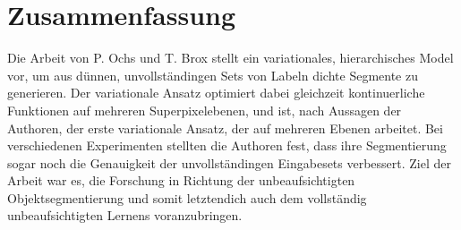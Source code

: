 \section{Zusammenfassung}

Die Arbeit von P. Ochs und T. Brox stellt ein variationales, hierarchisches Model vor, um aus dünnen, unvollständingen Sets von Labeln dichte Segmente
zu generieren. Der variationale Ansatz optimiert dabei gleichzeit kontinuerliche Funktionen auf mehreren Superpixelebenen, und ist, nach Aussagen
der Authoren, der erste variationale Ansatz, der auf mehreren Ebenen arbeitet. Bei verschiedenen Experimenten stellten die Authoren fest,
dass ihre Segmentierung sogar noch die Genauigkeit der unvollständingen Eingabesets verbessert. Ziel der Arbeit war es, die
Forschung in Richtung der unbeaufsichtigten Objektsegmentierung und somit letztendich auch dem vollständig unbeaufsichtigten Lernens voranzubringen.

